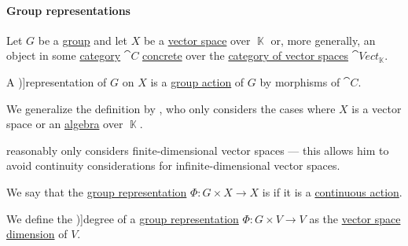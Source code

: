 \paragraph{Group representations}

\begin{definition}\label{def:group_representation}\mimprovised
  Let \( G \) be a \hyperref[def:group]{group} and let \( X \) be a \hyperref[def:vector_space]{vector space} over \( \BbbK \) or, more generally, an object in some \hyperref[def:category]{category} \( \cat{C} \) \hyperref[def:concrete_category]{concrete} over the \hyperref[def:vector_space]{category of vector spaces} \( \cat{Vect}_\BbbK \).

  A \term[ru=линейное представление (\cite[def. 11.1.1]{Винберг2014КурсАлгебры})]{representation} of \( G \) on \( X \) is a \hyperref[def:group_action]{group action} of \( G \) by morphisms of \( \cat{C} \).
\end{definition}
\begin{comments}
  \item We generalize the definition by , who only considers the cases where \( X \) is a vector space or an \hyperref[def:algebra_over_ring]{algebra} over \( \BbbK \).

   reasonably only considers finite-dimensional vector spaces --- this allows him to avoid continuity considerations for infinite-dimensional vector spaces.
\end{comments}

\begin{definition}\label{def:continuous_group_representation}
  We say that the \hyperref[def:group_representation]{group representation} \( \Phi: G \times X \to X \) is  if it is a \hyperref[def:continuous_monoid_action]{continuous action}.
\end{definition}

\begin{definition}\label{def:group_representation_degree}
  We define the \term[ru=размерность (представления) (\cite[def. 11.1.1]{Винберг2014КурсАлгебры})]{degree} of a \hyperref[def:group_representation]{group representation} \( \Phi: G \times V \to V \) as the \hyperref[def:vector_space_dimension]{vector space dimension} of \( V \).
\end{definition}

